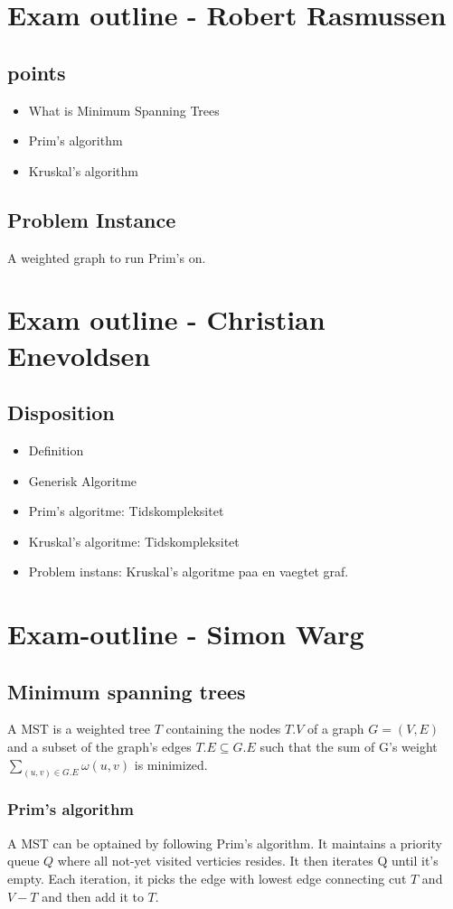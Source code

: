\documentclass[12pt]{article}
\begin{document}
\section*{Exam outline - Robert Rasmussen}
\subsection*{points}
\begin{itemize}
\item What is Minimum Spanning Trees
\item Prim's algorithm
\item Kruskal's algorithm
\end{itemize}

\subsection*{Problem Instance}
A weighted graph to run Prim's on.
\section*{Exam outline - Christian Enevoldsen}
\subsection *{Disposition}
\begin{itemize}
\item Definition
\item Generisk Algoritme
\item Prim's algoritme: Tidskompleksitet
\item Kruskal's algoritme:  Tidskompleksitet
\item Problem instans: Kruskal's algoritme paa en vaegtet graf.
\end{itemize}
\section*{Exam-outline - Simon Warg}
\subsection*{Minimum spanning trees}
A MST is a weighted tree $T$ containing the nodes $T.V$ of a graph $G = (V, E)$ and a subset of the graph's edges $T.E \subseteq G.E$ such that the sum of G's weight $\sum\limits_{(u,v) \in G.E} \omega{(u,v)}$ is minimized.

\subsubsection*{Prim's algorithm}
A MST can be optained by following Prim's algorithm. It maintains a priority queue $Q$  where all not-yet visited verticies resides. It then iterates Q until it's empty. Each iteration, it picks the edge with lowest edge connecting cut $T$ and $V - T$ and then add it to $T$.
\end{document}
